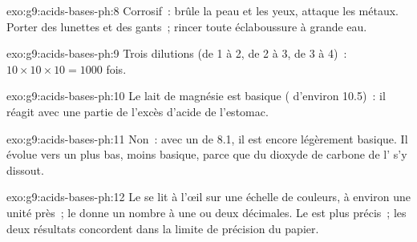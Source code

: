 \begin{solution}{exo:g9:acids-bases-ph:8}
Corrosif~: brûle la peau et les yeux, attaque les métaux. Porter des
lunettes et des gants~; rincer toute éclaboussure à grande eau.
\end{solution}

\begin{solution}{exo:g9:acids-bases-ph:9}
Trois dilutions (de 1 à 2, de 2 à 3, de 3 à 4)~: $10 \times 10 \times 10 =
1000$ fois.
\end{solution}

\begin{solution}{exo:g9:acids-bases-ph:10}
Le lait de magnésie est basique ( d'environ 10.5)~: il réagit avec une
partie de l'excès d'acide de l'estomac.
\end{solution}

\begin{solution}{exo:g9:acids-bases-ph:11}
Non~: avec un  de 8.1, il est encore légèrement basique. Il évolue vers
un  plus bas, moins basique, parce que du dioxyde de carbone de l'
s'y dissout.
\end{solution}

\begin{solution}{exo:g9:acids-bases-ph:12}
Le  se lit à l'œil sur une échelle de couleurs, à environ une
unité près~; le  donne un nombre à une ou deux décimales. Le
 est plus précis~; les deux résultats concordent dans la
limite de précision du papier.
\end{solution}

